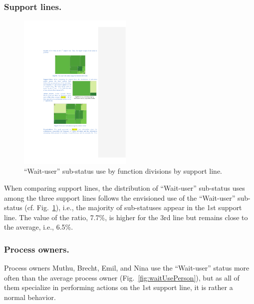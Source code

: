 \documentclass[lnbip]{svmultln}
\begin{document}
\subsubsection{Support lines.} 
\begin{figure}
  \vspace{-30pt}
  \begin{center}
    \includegraphics[width=0.48\textwidth]{"figs/pic 33"}
  \end{center}
  \caption{``Wait-user'' sub-status use
 by function divisions by support line.}
  \label{fig:waitUseFunctionsByLine}
  \vspace{-40pt}
\end{figure}
When comparing support lines, the distribution of ``Wait-user'' sub-status uses among the three support lines follows the envisioned use of the ``Wait-user'' sub-status (cf. Fig.~\ref{fig:waitUseFunctionsByLine}), i.e.,  the majority of sub-statuses appear in the 1st support line. The value of the ratio, 7.7\%, is higher for the 3rd line but remains close to the average, i.e., 6.5\%.

\vspace{2em}


\subsubsection{Process owners.} 
Process owners Muthu, Brecht, Emil, and Nina use the ``Wait-user'' status more often than the average process owner (Fig.~\ref{fig:waitUsePerson}), but as all of them specialize in performing actions on the 1st support line, it is rather a normal behavior.
 
\end{document}

